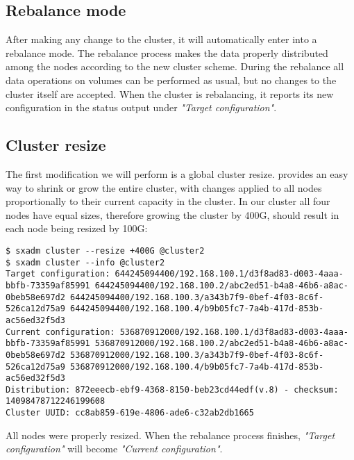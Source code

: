 \subsection{Rebalance mode}
After making any change to the cluster, it will automatically enter into
a rebalance mode. The rebalance process makes the data properly distributed
among the nodes according to the new cluster scheme. During the rebalance
all data operations on volumes can be performed as usual, but no changes
to the cluster itself are accepted. When the cluster is rebalancing, it
reports its new configuration in the status output under
\emph{"Target configuration"}.

\subsection{Cluster resize}
The first modification we will perform is a global cluster resize.
 provides an easy way to shrink or grow
the entire cluster, with changes applied to all nodes proportionally to
their current capacity in the cluster. In our cluster all four nodes
have equal sizes, therefore growing the cluster by 400G, should result
in each node being resized by 100G:
\begin{lstlisting}
$ sxadm cluster --resize +400G @cluster2
$ sxadm cluster --info @cluster2
Target configuration: 644245094400/192.168.100.1/d3f8ad83-d003-4aaa-bbfb-73359af85991 644245094400/192.168.100.2/abc2ed51-b4a8-46b6-a8ac-0beb58e697d2 644245094400/192.168.100.3/a343b7f9-0bef-4f03-8c6f-526ca12d75a9 644245094400/192.168.100.4/b9b05fc7-7a4b-417d-853b-ac56ed32f5d3 
Current configuration: 536870912000/192.168.100.1/d3f8ad83-d003-4aaa-bbfb-73359af85991 536870912000/192.168.100.2/abc2ed51-b4a8-46b6-a8ac-0beb58e697d2 536870912000/192.168.100.3/a343b7f9-0bef-4f03-8c6f-526ca12d75a9 536870912000/192.168.100.4/b9b05fc7-7a4b-417d-853b-ac56ed32f5d3 
Distribution: 872eeecb-ebf9-4368-8150-beb23cd44edf(v.8) - checksum: 14098478712246199608
Cluster UUID: cc8ab859-619e-4806-ade6-c32ab2db1665
\end{lstlisting}
All nodes were properly resized. When the rebalance process finishes, \emph{"Target
configuration"} will become \emph{"Current configuration"}.

